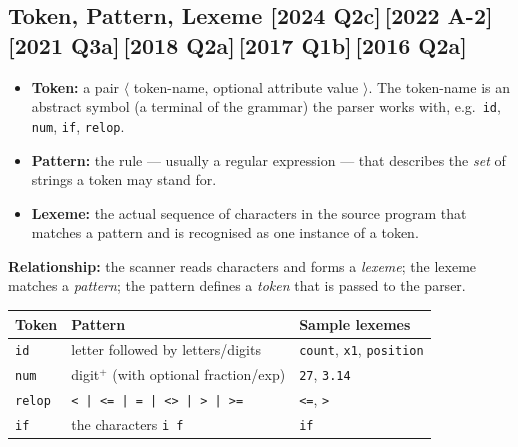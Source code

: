 \documentclass[12pt, a4paper]{article}
\newenvironment{qbox}{\begin{mdframed}[style=qframe]}{\end{mdframed}}
\newcommand{\yr}[1]{{\small\color{accent}\textbf{[#1]}}}
\newcommand{\term}[1]{\textbf{\color{keyblue}#1}}
\begin{document}
\subsection{Token, Pattern, Lexeme \yr{2024 Q2c}\,\yr{2022 A-2}\,\yr{2021 Q3a}\,\yr{2018 Q2a}\,\yr{2017 Q1b}\,\yr{2016 Q2a}}
\begin{qbox}
\begin{itemize}
\item \term{Token:} a pair \(\langle\) token-name, optional attribute value \(\rangle\). The token-name is an abstract
symbol (a terminal of the grammar) the parser works with, e.g.\ \texttt{id}, \texttt{num}, \texttt{if}, \texttt{relop}.
\item \term{Pattern:} the rule — usually a regular expression — that describes the \emph{set} of strings a token may stand for.
\item \term{Lexeme:} the actual sequence of characters in the source program that matches a pattern and is recognised as one instance of a token.
\end{itemize}
\textbf{Relationship:} the scanner reads characters and forms a \emph{lexeme}; the lexeme matches a \emph{pattern};
the pattern defines a \emph{token} that is passed to the parser.

\medskip
\begin{tabularx}{\linewidth}{@{}l l Y@{}}
\toprule
\textbf{Token} & \textbf{Pattern} & \textbf{Sample lexemes}\\
\midrule
\texttt{id} & letter followed by letters/digits & \texttt{count}, \texttt{x1}, \texttt{position}\\
\texttt{num} & digit$^+$ (with optional fraction/exp) & \texttt{27}, \texttt{3.14}\\
\texttt{relop} & \texttt{< | <= | = | <> | > | >=} & \texttt{<=}, \texttt{>}\\
\texttt{if} & the characters \texttt{i f} & \texttt{if}\\
\bottomrule
\end{tabularx}
\end{qbox}
\end{document}
